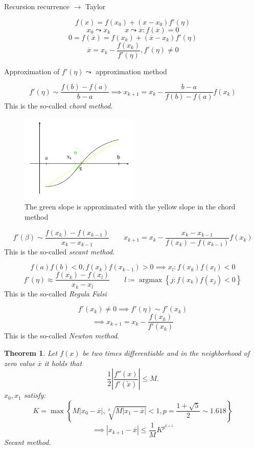 \documentclass{article}
\newtheorem{theorem}{Theorem}
\newcommand{\set}[1]{\left\{#1\right\}}
\newcommand{\card}[1]{\left|#1\right|}
\DeclareMathOperator{\argmax}{argmax}
\begin{document}
Recursion recurrence $\to$ Taylor

\[ f(x) = f(x_0) + (x - x_0) f'(\eta) \]
\[ x_0 \leadsto x_k \qquad x \leadsto \overline x: f(\overline x) = 0 \]
\[ 0 = f(\overline x) = f(x_k) + (\overline x - x_k) f'(\eta) \]
\[ \overline x = x_k - \frac{f(x_k)}{f'(\eta)}, f'(\eta) \neq 0 \]

Approximation of $f'(\eta) \leadsto$ approximation method

\[ f'(\eta) \sim \frac{f(b) - f(a)}{b - a} \implies x_{k+1} = x_k - \frac{b - a}{f(b) - f(a)} f(x_k) \]
This is the so-called \emph{chord method}.

\begin{figure}[!b]
  \begin{center}
    \includegraphics[width=0.5\textwidth]{img/12_approximation.pdf}
    \caption{The green slope is approximated with the yellow slope in the chord method}
    \label{img:approx12}
  \end{center}
\end{figure}

\[ f'(\beta) \sim \frac{f(x_k) - f(x_{k-1})}{x_k - x_{k-1}} \qquad x_{k+1} = x_k - \frac{x_k - x_{k-1}}{f(x_k) - f(x_{k-1})} f(x_k) \]
This is the so-called \emph{secant method}.

\[ f(a) f(b) < 0, f(x_k) f(x_{k-1}) > 0 \implies x_l: f(x_k) f(x_l) < 0 \]
\[ f'(\eta) \approx \frac{f(x_k) - f(x_l)}{x_k - x_l} \qquad l \coloneqq \argmax\set{j: f(x_k) f(x_j) < 0} \]  %
This is the so-called \emph{Regula Falsi}

\[ f'(x_k) \neq 0 \implies f'(\eta) \sim f'(x_k) \]
\[ \implies x_{k+1} = x_k - \frac{f(x_k)}{f'(x_k)} \]
This is the so-called \emph{Newton method}.

\begin{theorem}
  Let $f(x)$ be two times differentiable and in the neighborhood of zero value $\overline x$ it holds that
  \[ \frac12 \card{\frac{f''(x)}{f'(\tilde x)}} \leq M. \]
  $x_0, x_1$ satisfy:
  \[ K = \max\set{M \card{x_0 - \overline x}, \sqrt[p]{M \card{x_1 - \overline x}} < 1, p = \frac{1 + \sqrt5}{2} \sim 1.618} \]
  \[ \implies \card{x_{k+1} - \overline x} \leq \frac{1}{M} K^{p^{k+1}} \]
  Secant method.
\end{theorem}
\end{document}
